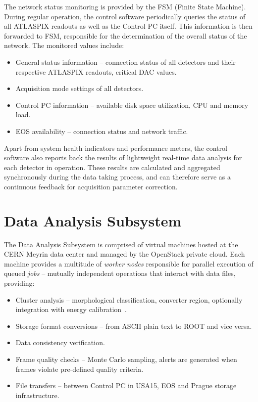 \documentclass[conference]{IEEEtran}
\begin{document}
The network status monitoring is provided by the FSM (Finite State Machine). During regular operation, the control software periodically queries the status of all ATLASPIX readouts as well as the Control PC itself. This information is then forwarded to FSM, responsible for the determination of the overall status of the network. The monitored values include:
~
\begin{itemize}
  \item General status information -- connection status of all detectors and their respective ATLASPIX readouts, critical DAC values.
  \item Acquisition mode settings of all detectors.
  \item Control PC information -- available disk space utilization, CPU and memory load.
  \item EOS availability -- connection status and network traffic.
\end{itemize}

Apart from system health indicators and performance meters, the control software also reports back the results of lightweight real-time data analysis for each detector in operation. These results are calculated and aggregated synchronously during the data taking process, and can therefore serve as a continuous feedback for acquisition parameter correction.


\section{\label{sec:analysis}Data Analysis Subsystem}
The Data Analysis Subsystem is comprised of virtual machines hosted at the CERN Meyrin data center and managed by the OpenStack private cloud. Each machine provides a multitude of \textit{worker nodes} responsible for parallel execution of queued \textit{jobs} -- mutually independent operations that interact with data files, providing:
~
\begin{itemize}
  \item Cluster analysis -- morphological classification, converter region, optionally integration with energy calibration~\cite{Holy2008}.
  \item Storage format conversions -- from ASCII plain text to ROOT and vice versa.
  \item Data consistency verification.
  \item Frame quality checks -- Monte Carlo sampling, alerts are generated when frames violate pre-defined quality criteria.
  \item File transfers -- between Control PC in USA15, EOS and Prague storage infrastructure.
\end{itemize}
\end{document}
